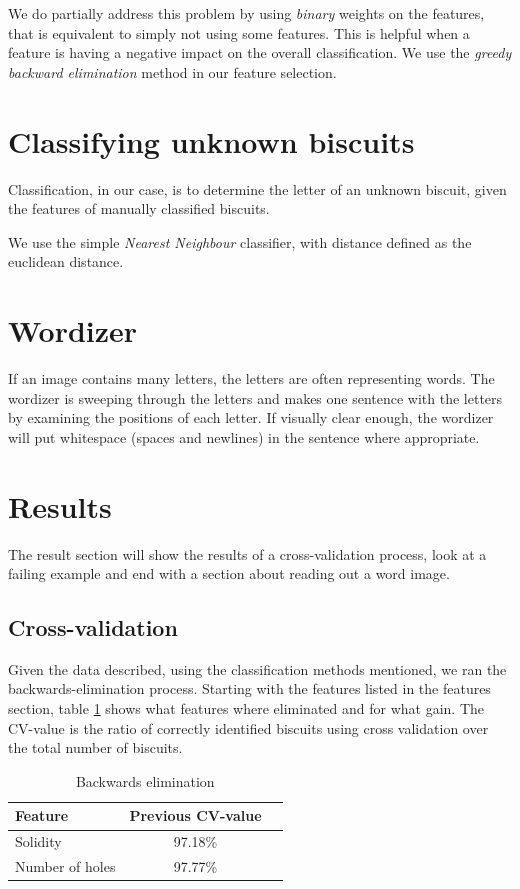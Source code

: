 \documentclass[a4paper,11pt]{article}
\begin{document}
We do partially address this problem by using \emph{binary} weights on the features, 
that is equivalent to simply not using some features.
This is helpful when a feature is having a negative impact on the overall classification.
We use the \emph{greedy backward elimination} method in our feature selection.
\section{Classifying unknown biscuits}
Classification, in our case, is to determine the letter of an unknown biscuit, given the features of manually classified biscuits.

We use the simple \emph{Nearest Neighbour} classifier, with distance defined as the euclidean distance.

\section{Wordizer}
If an image contains many letters, the letters are often representing words.
The wordizer is sweeping through the letters and makes one sentence with the letters by examining the positions of each letter.
If visually clear enough, the wordizer will put whitespace (spaces and newlines) in the sentence where appropriate.
\section{Results}
The result section will show the results of a cross-validation process, look at a failing example and end with a section about reading out a word image.
\subsection{Cross-validation}
Given the data described, using the classification methods mentioned, we ran the backwards-elimination process.
Starting with the features listed in the features section, table \ref{tab:backelim} shows what features
where eliminated and for what gain.
The CV-value is the ratio of correctly identified biscuits using cross validation over the total number of biscuits.


\begin{table}[h!b!p!]
\caption{Backwards elimination}
\begin{center}
    \begin{tabular}{ | l | c | c | }
    Feature         & Previous CV-value \\ \hline
    Solidity        & 97.18\%           \\ \hline
    Number of holes & 97.77\%           \\ \hline
    \end{tabular}
\end{center}
\label{tab:backelim}
\end{table}
\end{document}
